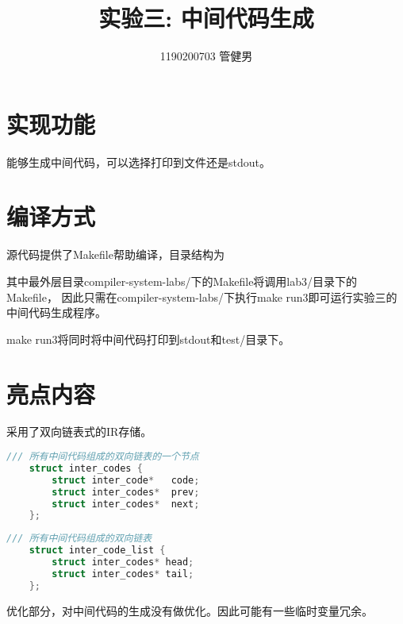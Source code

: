 \documentclass{article}
\title{实验三: 中间代码生成}
\author{1190200703 管健男}
\date{}
\begin{document}
\maketitle


\section{实现功能}

能够生成中间代码，可以选择打印到文件还是stdout。

\section{编译方式}

源代码提供了Makefile帮助编译，目录结构为

\begin{figure}[H]
    \centering
    \begin{minipage}{0.4\linewidth}
    \end{minipage}
\end{figure}

其中最外层目录compiler-system-labs/下的Makefile将调用lab3/目录下的Makefile，
因此只需在compiler-system-labs/下执行make run3即可运行实验三的中间代码生成程序。

make run3将同时将中间代码打印到stdout和test/目录下。

\section{亮点内容}

采用了双向链表式的IR存储。

\begin{lstlisting}[language=C, caption=双向链表节点结构体声明]
    /// 所有中间代码组成的双向链表的一个节点
    struct inter_codes {
        struct inter_code*   code;
        struct inter_codes*  prev;
        struct inter_codes*  next;
    };
\end{lstlisting}

\begin{lstlisting}[language=C, caption=双向链表节点结构体声明]
    /// 所有中间代码组成的双向链表
    struct inter_code_list {
        struct inter_codes* head;
        struct inter_codes* tail;
    };
\end{lstlisting}

优化部分，对中间代码的生成没有做优化。因此可能有一些临时变量冗余。
\end{document}
